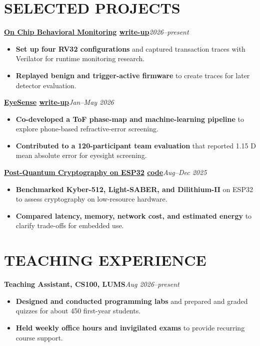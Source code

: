 \documentclass[9pt]{article}
\newcommand{\entry}[3]{\textbf{#1}\hfill {\small\itshape #2}\\[-2pt]{#3}\par}
\begin{document}
\section*{SELECTED PROJECTS}
\entry{\href{https://kac224.github.io/\#projects}{On Chip Behavioral Monitoring} \textperiodcentered{} \href{https://kac224.github.io/assets/writeups/on-chip-behavioral-monitoring-draft.pdf}{write-up}}{2026--present}{}
\begin{itemize}
\item \textbf{Set up four RV32 configurations} and captured transaction traces with Verilator for runtime monitoring research.
\item \textbf{Replayed benign and trigger-active firmware} to create traces for later detector evaluation.
\end{itemize}
\entry{\href{https://kac224.github.io/\#projects}{EyeSense} \textperiodcentered{} \href{https://kac224.github.io/assets/writeups/eyesense.pdf}{write-up}}{Jan--May 2026}{}
\begin{itemize}
\item \textbf{Co-developed a ToF phase-map and machine-learning pipeline} to explore phone-based refractive-error screening.
\item \textbf{Contributed to a 120-participant team evaluation} that reported 1.15 D mean absolute error for eyesight screening.
\end{itemize}
\entry{\href{https://kac224.github.io/\#projects}{Post-Quantum Cryptography on ESP32} \textperiodcentered{} \href{https://github.com/KAC224/cryptography-final-project}{code}}{Aug--Dec 2025}{}
\begin{itemize}
\item \textbf{Benchmarked Kyber-512, Light-SABER, and Dilithium-II} on ESP32 to assess cryptography on low-resource hardware.
\item \textbf{Compared latency, memory, network cost, and estimated energy} to clarify trade-offs for embedded use.
\end{itemize}
\section*{TEACHING EXPERIENCE}
\entry{Teaching Assistant, CS100, LUMS}{Aug 2026--present}{}
\begin{itemize}
\item \textbf{Designed and conducted programming labs} and prepared and graded quizzes for about 450 first-year students.
\item \textbf{Held weekly office hours and invigilated exams} to provide recurring course support.
\end{itemize}
\end{document}
